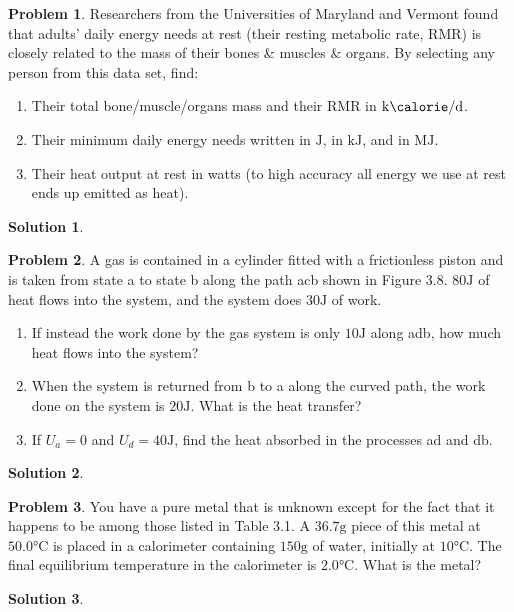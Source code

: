\documentclass[10pt]{article}
\theoremstyle{definition}
\newtheorem{problem}{Problem}
\newtheorem{soln}{Solution}
\begin{document}
\begin{problem}
  Researchers from the Universities of Maryland and Vermont found that adults' daily energy needs at rest (their resting metabolic rate, RMR) 
  is closely related to the mass of their bones \& muscles \& organs. By selecting any person from this data set, find:
  \begin{enumerate}[label=(\alph*)]
    \item Their total bone/muscle/organs mass and their RMR in $\unit{\kilo\calorie\per\day}$.
    \item Their minimum daily energy needs written in $\unit{\joule}$, in $\unit{\kilo\joule}$, and in $\unit{\mega\joule}$.
    \item Their heat output at rest in watts (to high accuracy all energy we use at rest ends up emitted as heat).
  \end{enumerate}
\end{problem}
\begin{soln}
\end{soln}

\begin{problem}
  A gas is contained in a cylinder fitted with a frictionless piston and is taken from state a to state b along the path acb shown in Figure 3.8.
  $80\unit{\joule}$ of heat flows into the system, and the system does $30\unit{\joule}$ of work.
  \begin{enumerate}[label=(\alph*)]
    \item If instead the work done by the gas system is only $10\unit{\joule}$ along adb, how much heat flows into the system?
    \item When the system is returned from b to a along the curved path, the work done on the system is $20\unit{\joule}$. What is the heat transfer?
    \item If $U_a = 0$ and $U_d = 40\unit{\joule}$, find the heat absorbed in the processes ad and db.
  \end{enumerate}
\end{problem}
\begin{soln}
\end{soln}

\begin{problem}
  You have a pure metal that is unknown except for the fact that it happens to be among those listed in Table 3.1. A $36.7\unit{\gram}$ piece of this metal
  at $50.0\unit{\celsius}$ is placed in a calorimeter containing $150\unit{\gram}$ of water, initially at $10\unit{\celsius}$. The final equilibrium temperature in the calorimeter is $2.0\unit{\celsius}$. 
  What is the metal?
\end{problem}
\begin{soln}
\end{soln}
\end{document}

